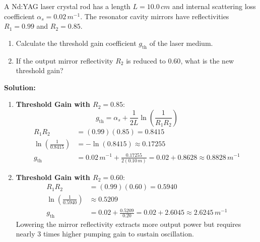 \begin{example}
A Nd:YAG laser crystal rod has a length $L = 10.0\,\si{cm}$ and internal scattering loss coefficient $\alpha_s = 0.02\,\si{m^{-1}}$. The resonator cavity mirrors have reflectivities $R_1 = 0.99$ and $R_2 = 0.85$.
\begin{enumerate}
    \item Calculate the threshold gain coefficient $g_{\text{th}}$ of the laser medium.
    \item If the output mirror reflectivity $R_2$ is reduced to $0.60$, what is the new threshold gain?
\end{enumerate}

\textbf{Solution:}
\begin{enumerate}
    \item \textbf{Threshold Gain with $R_2 = 0.85$}:
    \begin{equation*}
        g_{\text{th}} = \alpha_s + \frac{1}{2L} \ln\left( \frac{1}{R_1 R_2} \right)
    \end{equation*}
    \begin{align*}
        R_1 R_2 &= (0.99)(0.85) = 0.8415 \\
        \ln\left(\frac{1}{0.8415}\right) &= -\ln(0.8415) \approx 0.17255 \\
        g_{\text{th}} &= 0.02\,\si{m^{-1}} + \frac{0.17255}{2(0.10\,\si{m})} = 0.02 + 0.8628 \approx 0.8828\,\si{m^{-1}}
    \end{align*}
    
    \item \textbf{Threshold Gain with $R_2 = 0.60$}:
    \begin{align*}
        R_1 R_2 &= (0.99)(0.60) = 0.5940 \\
        \ln\left(\frac{1}{0.5940}\right) &\approx 0.5209 \\
        g_{\text{th}} &= 0.02 + \frac{0.5209}{0.20} = 0.02 + 2.6045 \approx 2.6245\,\si{m^{-1}}
    \end{align*}
    Lowering the mirror reflectivity extracts more output power but requires nearly 3 times higher pumping gain to sustain oscillation.
\end{enumerate}
\end{example}

